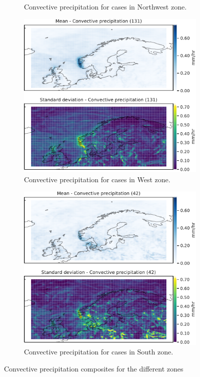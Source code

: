 \begin{figure}
\begin{subfigure}[b]{0.49\textwidth}
    \caption{Convective precipitation for cases in Northwest zone.}
    \label{fig:NordWestcP}
\end{subfigure}
\begin{subfigure}[b]{0.49\textwidth}
    \centering
    \includegraphics[width=\textwidth]{Figures/cPVest.pdf}
    \caption{Convective precipitation for cases in West zone.}
    \label{fig:WestcP}
\end{subfigure}
\begin{subfigure}[b]{0.49\textwidth}
    \centering
    \includegraphics[width=\textwidth]{Figures/cPSor.pdf}
    \caption{Convective precipitation for cases in South zone.}
    \label{fig:SouthcP}
\end{subfigure}
\caption{Convective precipitation composites for the different zones}
\label{fig:convectivezones}
\end{figure}

